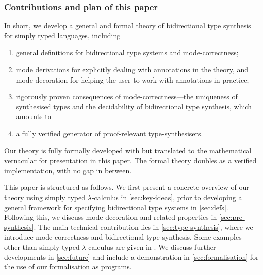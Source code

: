 \subsubsection{Contributions and plan of this paper}

%
In short, we develop a general and formal theory of bidirectional type synthesis for simply typed languages, including 
\begin{enumerate}
  \item general definitions for bidirectional type systems and mode-correctness;
  \item mode derivations for explicitly dealing with annotations in the theory, and mode decoration for helping the user to work with annotations in practice;
  \item rigorously proven consequences of mode-correctness---the uniqueness of synthesised types and the decidability of bidirectional type synthesis, which amounts to
  \item a fully verified generator of proof-relevant type-synthesisers.
\end{enumerate}
Our theory is fully formally developed with \Agda but translated to the mathematical vernacular for presentation in this paper.
The formal theory doubles as a verified implementation, with no gap in between.


This paper is structured as follows.
We first present a concrete overview of our theory using simply typed $\lambda$-calculus in \cref{sec:key-ideas}, prior to developing a general framework for specifying bidirectional type systems in \cref{sec:defs}.
Following this, we discuss mode decoration and related properties in \cref{sec:pre-synthesis}.
The main technical contribution lies in \cref{sec:type-synthesis}, where we introduce mode-correctness and bidirectional type synthesis.
Some examples other than simply typed $\lambda$-calculus are given in .
We discuss further developments in \cref{sec:future} and include a demonstration in \cref{sec:formalisation} for the use of our \Agda formalisation as programs.
